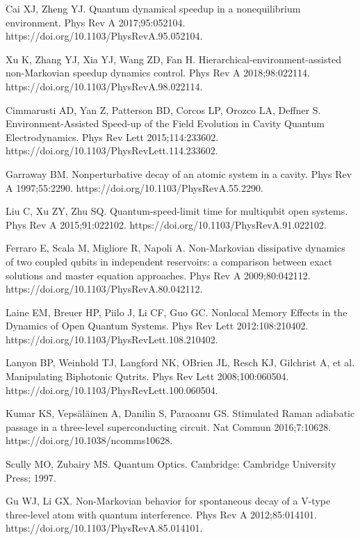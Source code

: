 \documentclass[
showpacs,  %
showkeys,  %
aps,       %
amsthm,    %
amsmath,   %
amsfonts,  %
amssymb    %
]{revtex4-1}          %
\begin{document}
\begin{thebibliography}{}
Cai XJ, Zheng YJ. Quantum dynamical speedup in a nonequilibrium environment. Phys Rev A 2017;95:052104. https://doi.org/10.1103/PhysRevA.95.052104.

Xu K, Zhang YJ, Xia YJ, Wang ZD, Fan H. Hierarchical-environment-assisted non-Markovian speedup dynamics control. Phys Rev A 2018;98:022114. https://doi.org/10.1103/PhysRevA.98.022114.

Cimmarusti AD, Yan Z, Patterson BD, Corcos LP, Orozco LA, Deffner S. Environment-Assisted Speed-up of the Field Evolution in Cavity Quantum Electrodynamics. Phys Rev Lett 2015;114:233602. https://doi.org/10.1103/PhysRevLett.114.233602.

Garraway BM. Nonperturbative decay of an atomic system in a cavity. Phys Rev A 1997;55:2290. https://doi.org/10.1103/PhysRevA.55.2290.

Liu C, Xu ZY, Zhu SQ. Quantum-speed-limit time for multiqubit open systems. Phys Rev A 2015;91:022102. https://doi.org/10.1103/PhysRevA.91.022102.

Ferraro E, Scala M, Migliore R, Napoli A. Non-Markovian dissipative dynamics of two coupled qubits in independent reservoirs: a comparison between exact solutions and master equation approaches. Phys Rev A 2009;80:042112. https://doi.org/10.1103/PhysRevA.80.042112.

Laine EM, Breuer HP, Piilo J, Li CF, Guo GC. Nonlocal Memory Effects in the Dynamics of Open Quantum Systems. Phys Rev Lett 2012:108:210402. https://doi.org/10.1103/PhysRevLett.108.210402.

Lanyon BP, Weinhold TJ, Langford NK, OBrien JL, Resch KJ, Gilchrist A, et al. Manipulating Biphotonic Qutrits. Phys Rev Lett 2008;100:060504. https://doi.org/10.1103/PhysRevLett.100.060504.

Kumar KS, Veps\"{a}l\"{a}inen A, Danilin S, Paraoanu GS. Stimulated Raman adiabatic passage in a three-level superconducting circuit. Nat Commun 2016;7:10628. https://doi.org/10.1038/ncomms10628.

Scully MO, Zubairy MS. Quantum Optics. Cambridge: Cambridge University Press; 1997.

Gu WJ, Li GX. Non-Markovian behavior for spontaneous decay of a V-type three-level atom with quantum interference. Phys Rev A 2012;85:014101. https://doi.org/10.1103/PhysRevA.85.014101.





\end{thebibliography}
\end{document}
